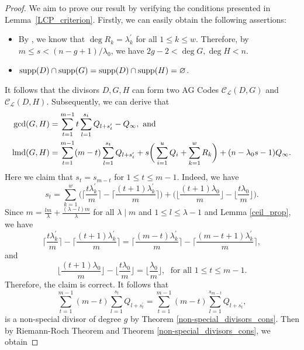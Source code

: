 \documentclass[journal,12pt,onecolumn]{IEEEtran}
\begin{document}
\begin{proof}
    We aim to prove our result by verifying the conditions presented in Lemma~\ref{LCP_criterion}. Firstly, we can easily obtain the following assertions:
    \begin{itemize}
        \item By \cite[Prop. 3.7.3]{Algebraic_Function_Fields_and_Codes}, we know that $\deg R_k = \lambda_k^\prime$ for all $1\le k\le w$. Therefore, by $m\le s <(n-g+1)/\lambda_0$, we have $2g-2<\deg G,\deg H<n$.
        \item ${\rm supp}(D)\cap{\rm supp}(G)={\rm supp}(D)\cap{\rm supp}(H)=\varnothing$. 
    \end{itemize}
    It follows that the divisors $D,G,H$ can form two AG Codes $\mathcal{C}_{\mathcal{L}}(D,G)$ and $\mathcal{C}_{\mathcal{L}}(D,H)$. Subsequently, we can derive that
    \begin{align*}
            \gcd(G,H)&=\sum_{t=1}^{m-1}t\sum_{l=1}^{s_t}Q_{l+s_t^\prime}-Q_\infty, \text{ and }\\
            {\rm lmd}(G,H)&=\sum_{t=1}^{m-1}(m-t)\sum_{l=1}^{s_t}Q_{l+s_t^\prime} +  s\bigg( \sum_{i=1}^uQ_i + \sum_{k=1}^wR_k \bigg) + (n-\lambda_0s-1)Q_\infty.
    \end{align*}
    Here we claim that $s_t=s_{m-t}$ for $1\le t\le m-1$. Indeed, we have
    \begin{equation}\label{s_t_v=0}
        s_t = \sum_{k=1}^w\bigg(\bigg\lceil\frac{t\lambda_k^\prime}{m}\bigg\rceil-\bigg\lceil\frac{(t+1)\lambda_k^\prime}{m}\bigg\rceil\bigg)+\bigg(\bigg\lfloor\frac{(t+1)\lambda_0}{m}\bigg\rfloor-\bigg\lfloor\frac{t\lambda_0}{m}\bigg\rfloor\bigg).
    \end{equation}
    Since $m = \frac{l m}{\lambda}+\frac{(\lambda-l) m}{\lambda}$ for all $\lambda\mid m$ and $1\le l\le \lambda-1$ and Lemma \ref{ceil_prop}, we have
    \[
        \bigg\lceil\frac{t\lambda_k^\prime}{m}\bigg\rceil-\bigg\lceil\frac{(t+1)\lambda_k^\prime}{m}\bigg\rceil = \bigg\lceil\frac{(m-t)\lambda_k^\prime}{m}\bigg\rceil-\bigg\lceil\frac{(m-t+1)\lambda_k^\prime}{m}\bigg\rceil,
    \]
    and
    \[
        \bigg\lfloor\frac{(t+1)\lambda_0}{m}\bigg\rfloor-\bigg\lfloor\frac{t\lambda_0}{m}\bigg\rfloor = \bigg\lfloor\frac{\lambda_0}{m}\bigg\rfloor ,\;\text{ for all }1\le t\le m-1. 
    \]
    Therefore, the claim is correct. It follows that
    \[
        \sum_{t=1}^{m-1}(m-t)\sum_{l=1}^{s_t}Q_{l+s_t^\prime} = \sum_{t=1}^{m-1}(m-t)\sum_{l=1}^{s_{m-t}}Q_{l+s_t^\prime}, 
    \]
    is a non-special divisor of degree $g$ by Theorem \ref{non-special_divisors_cons}. Then by Riemann-Roch Theorem and Theorem \ref{non-special_divisors_cons}, we obtain

\end{proof}
\end{document}
